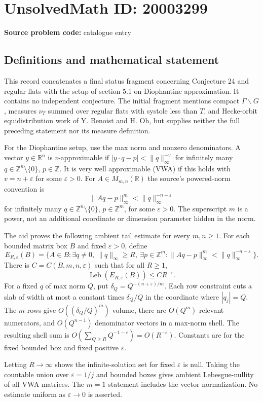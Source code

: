 \documentclass[11pt]{article}
\newcommand{\Z}{\mathbb{Z}}
\newcommand{\R}{\mathbb{R}}
\newcommand{\eps}{\varepsilon}
\begin{document}
\section*{UnsolvedMath ID: 20003299}
\textbf{Source problem code:} catalogue entry
\subsection{Definitions and mathematical statement}
This record concatenates a final status fragment concerning Conjecture 24 and regular flats with the setup of section 5.1 on Diophantine approximation. It contains no independent conjecture. The initial fragment mentions compact $\Gamma\backslash G$, measures $\nu_T$ summed over regular flats with systole less than $T$, and Hecke-orbit equidistribution work of Y. Benoist and H. Oh, but supplies neither the full preceding statement nor its measure definition.

For the Diophantine setup, use the max norm and nonzero denominators. A vector $y\in\R^n$ is $v$-approximable if $|y\cdot q-p|<\|q\|_\infty^{-v}$ for infinitely many $q\in\Z^n\setminus\{0\}$, $p\in\Z$. It is very well approximable (VWA) if this holds with $v=n+\eps$ for some $\eps>0$. For $A\in M_{m,n}(\R)$ the source's powered-norm convention is
\[
 \|Aq-p\|_\infty^{m}<\|q\|_\infty^{-n-\eps}
\]
for infinitely many $q\in\Z^n\setminus\{0\}$, $p\in\Z^m$, for some $\eps>0$. The superscript $m$ is a power, not an additional coordinate or dimension parameter hidden in the norm.

The aid proves the following ambient tail estimate for every $m,n\geq1$. For each bounded matrix box $B$ and fixed $\eps>0$, define
\[
 E_{R,\eps}(B)=\{A\in B:\exists q\ne0,\ \|q\|_\infty\geq R,
 \ \exists p\in\Z^m:
 \|Aq-p\|_\infty^m<\|q\|_\infty^{-n-\eps}\}.
\]
There is $C=C(B,m,n,\eps)$ such that for all $R\geq1$,
\[
 \operatorname{Leb}(E_{R,\eps}(B))\leq CR^{-\eps}.
\]
For a fixed $q$ of max norm $Q$, put $\delta_Q=Q^{-(n+\eps)/m}$. Each row constraint cuts a slab of width at most a constant times $\delta_Q/Q$ in the coordinate where $|q_j|=Q$. The $m$ rows give $O((\delta_Q/Q)^m)$ volume, there are $O(Q^m)$ relevant numerators, and $O(Q^{n-1})$ denominator vectors in a max-norm shell. The resulting shell sum is $O(\sum_{Q\geq R}Q^{-1-\eps})=O(R^{-\eps})$. Constants are for the fixed bounded box and fixed positive $\eps$.

Letting $R\to\infty$ shows the infinite-solution set for fixed $\eps$ is null. Taking the countable union over $\eps=1/j$ and bounded boxes gives ambient Lebesgue-nullity of all VWA matrices. The $m=1$ statement includes the vector normalization. No estimate uniform as $\eps\to0$ is asserted.
\end{document}
